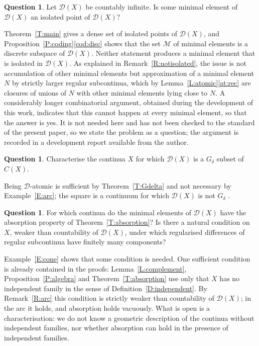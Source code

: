\documentclass[11pt,reqno]{amsart}
\theoremstyle{plain}
\theoremstyle{definition}
\newtheorem{question}[theorem]{Question}
\theoremstyle{remark}
\newcommand{\D}{\mathcal{D}}
\newcommand{\M}{\mathcal{M}}
\begin{document}
\begin{question}\label{Q:isolated}
Let $\D(X)$ be countably infinite. Is some minimal element of $\D(X)$ an isolated point of $\D(X)$?
\end{question}

Theorem~\ref{T:main} gives a dense set of isolated points of $\D(X)$, and Proposition~\ref{P:coding}\ref{cod:disc} shows that the set $\M$ of minimal elements is a discrete subspace of $\D(X)$. Neither statement produces a minimal element that is isolated in $\D(X)$. As explained in Remark~\ref{R:notisolated}, the issue is not accumulation of other minimal elements but approximation of a minimal element $N$ by strictly larger regular subcontinua, which by Lemma~\ref{L:atomic}\ref{at:rec} are closures of unions of $N$ with other minimal elements lying close to $N$. A considerably longer combinatorial argument, obtained during the development of this work, indicates that this cannot happen at every minimal element, so that the answer is yes. It is not needed here and has not been checked to the standard of the present paper, so we state the problem as a question; the argument is recorded in a development report available from the author.

\begin{question}\label{Q:polish}
Characterise the continua $X$ for which $\D(X)$ is a $G_\delta$ subset of $C(X)$.
\end{question}

Being $\D$-atomic is sufficient by Theorem~\ref{T:Gdelta} and not necessary by Example~\ref{E:arc}; the square is a continuum for which $\D(X)$ is not $G_\delta$ \cite[p.~23]{Ram23}.

\begin{question}\label{Q:absorb}
For which continua do the minimal elements of $\D(X)$ have the absorption property of Theorem~\ref{T:absorption}? Is there a natural condition on $X$, weaker than countability of $\D(X)$, under which regularised differences of regular subcontinua have finitely many components?
\end{question}

Example~\ref{E:cone} shows that some condition is needed. One sufficient condition is already contained in the proofs: Lemma~\ref{L:complement}, Proposition~\ref{P:algebra} and Theorem~\ref{T:absorption} use only that $X$ has no independent family in the sense of Definition~\ref{D:independent}. By Remark~\ref{R:arc} this condition is strictly weaker than countability of $\D(X)$; in the arc it holds, and absorption holds vacuously. What is open is a characterisation: we do not know a geometric description of the continua without independent families, nor whether absorption can hold in the presence of independent families.
\end{document}
